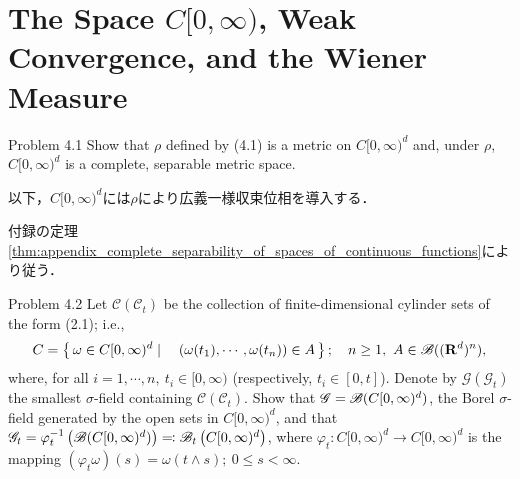 \section{The Space $C[0,\infty)$, Weak Convergence, and the Wiener Measure}
	\begin{itembox}[l]{Problem 4.1}
		Show that $\rho$ defined by (4.1) is a metric on $C[0,\infty)^d$ and, under $\rho$, 
		$C[0,\infty)^d$ is a complete, separable metric space.
	\end{itembox}
	以下，$C[0,\infty)^d$には$\rho$により広義一様収束位相を導入する．
	
	\begin{prf}
		付録の定理\ref{thm:appendix_complete_separability_of_spaces_of_continuous_functions}により従う．
		\QED
	\end{prf}

\begin{itembox}[l]{Problem 4.2}
	Let $\mathscr{C}(\mathscr{C}_t)$ be the collection of finite-dimensional cylinder sets of the form (2.1); i.e.,
	\begin{align}
		C = \left\{\, \omega \in C[0,\infty)^d \mid \quad (\omega(t_1),\cdots,\omega(t_n)) \in A\, \right\};
		\quad n \geq 1,\ A \in \mathscr{B}((\mathbf{R}^d)^n),
	\end{align}
	where, for all $i=1,\cdots,n,\ t_i \in [0,\infty)$ (respectively, $t_i \in [0,t]$).
	Denote by $\mathscr{G}(\mathscr{G}_t)$ the smallest $\sigma$-field containing $\mathscr{C}(\mathscr{C}_t)$.
	Show that $\mathscr{G} = \mathscr{B}(C[0,\infty)^d)$, the Borel $\sigma$-field generated by the open sets in
	$C[0,\infty)^d$, and that $\mathscr{G}_t = \varphi_t^{-1}\left( \mathscr{B}(C[0,\infty)^d) \right) \eqqcolon
	\mathscr{B}_t\left( C[0,\infty)^d \right)$, where $\varphi_t:C[0,\infty)^d \longrightarrow C[0,\infty)^d$ is the
	mapping $(\varphi_t\omega)(s) = \omega(t \wedge s);\ 0 \leq s < \infty$.
\end{itembox}

